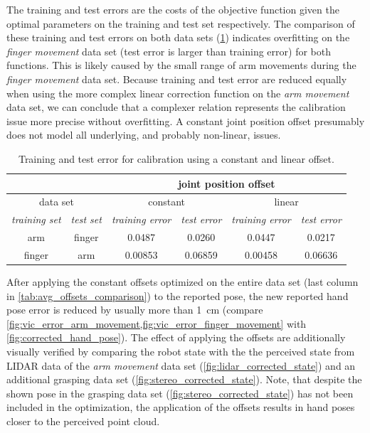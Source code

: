 The training and test errors are the costs of the objective function given the optimal parameters on the training and test set respectively. The comparison of these training and test errors on both data sets (\cref{tab:offset_training_test_error}) indicates overfitting on the \textit{finger movement} data set (test error is larger than training error) for both functions. This is likely caused by the small range of arm movements during the \textit{finger movement} data set. Because training and test error are reduced equally when using the more complex linear correction function on the \textit{arm movement} data set, we can conclude that a complexer relation represents the calibration issue more precise without overfitting. A constant joint position offset presumably does not model all underlying, and probably non-linear, issues.

\begin{table}[h]
\centering
\begin{tabular}{|c|c||c|c||c|c|}
\hline
\multicolumn{2}{|c||}{} & \multicolumn{4}{c|}{joint position offset} \\
\hline
\multicolumn{2}{|c||}{data set}  & \multicolumn{2}{c||}{constant} & \multicolumn{2}{c|}{linear} \\
\hline
\textit{training set} & \textit{test set} & \textit{training error} & \textit{test error} & \textit{training error} & \textit{test error} \\
\hline
arm & finger & 0.0487 & 0.0260 & 0.0447 & 0.0217 \\
\hline
finger & arm & 0.00853 & 0.06859 & 0.00458 & 0.06636 \\
\hline
\end{tabular}
\caption[Calibration error comparison]{Training and test error for calibration using a constant and linear offset.}
\label{tab:offset_training_test_error}
\end{table}

After applying the constant offsets optimized on the entire data set (last column in \cref{tab:avg_offsets_comparison}) to the reported pose, the new reported hand pose error is reduced by usually more than \SI{1}{\cm} (compare \cref{fig:vic_error_arm_movement,fig:vic_error_finger_movement} with \cref{fig:corrected_hand_pose}). The effect of applying the offsets are additionally visually verified by comparing the robot state with the the perceived state from LIDAR data of the \textit{arm movement} data set (\cref{fig:lidar_corrected_state}) and an additional grasping data set (\cref{fig:stereo_corrected_state}). Note, that despite the shown pose in the grasping data set (\cref{fig:stereo_corrected_state}) has not been included in the optimization, the application of the offsets results in hand poses closer to the perceived point cloud.

